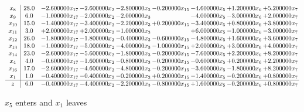 \documentclass[10pt]{article}
\begin{document}
 \[\begin{array}{c| c c@{\hskip 2pt} c@{\hskip 2pt} c@{\hskip 2pt} c@{\hskip 2pt} c@{\hskip 2pt} c@{\hskip 2pt} c@{\hskip 2pt} }
 x_{8}   &  28.0 & -2.600000 x_{17} & -2.600000 x_{2} & -2.800000 x_{3} & -0.200000 x_{15} & -4.600000 x_{5} & + 1.200000 x_{6} & + 5.200000 x_{7}\\
 x_{9}   &  6.0 & -1.000000 x_{17} & -2.000000 x_{2} & -2.000000 x_{3} &   & -4.000000 x_{5} & -3.000000 x_{6} & + 2.000000 x_{7}\\
 x_{10}   &  15.0 & -1.400000 x_{17} & -3.400000 x_{2} & -2.200000 x_{3} & + 0.200000 x_{15} & -3.400000 x_{5} & + 0.800000 x_{6} & + 3.800000 x_{7}\\
 x_{11}   &  3.0 & + 2.000000 x_{17} & + 2.000000 x_{2} & -1.000000 x_{3} &   & + 6.000000 x_{5} & -1.000000 x_{6} & -3.000000 x_{7}\\
 x_{12}   &  26.0 & -1.800000 x_{17} & -1.800000 x_{2} & -0.400000 x_{3} & -0.600000 x_{15} & -4.800000 x_{5} & + 1.600000 x_{6} & + 3.600000 x_{7}\\
 x_{13}   &  18.0 & -1.000000 x_{17} & -5.000000 x_{2} & -4.000000 x_{3} & -1.000000 x_{15} & + 2.000000 x_{5} & + 3.000000 x_{6} & + 4.000000 x_{7}\\
 x_{14}   &  23.0 & -2.600000 x_{17} & -5.600000 x_{2} & -1.800000 x_{3} & -0.200000 x_{15} & -7.600000 x_{5} & + 2.200000 x_{6} & + 8.200000 x_{7}\\
 x_{4}   &  4.0 & -0.600000 x_{17} & -1.600000 x_{2} & -0.800000 x_{3} & -0.200000 x_{15} & -0.600000 x_{5} & + 0.200000 x_{6} & + 2.200000 x_{7}\\
 x_{16}   &  17.0 & -2.600000 x_{17} & -4.600000 x_{2} & -4.800000 x_{3} & -0.200000 x_{15} & -3.600000 x_{5} & -1.800000 x_{6} & + 8.200000 x_{7}\\
 x_{1}   &  1.0 & -0.400000 x_{17} & -0.400000 x_{2} & -0.200000 x_{3} & + 0.200000 x_{15} & -1.400000 x_{5} & -0.200000 x_{6} & + 0.800000 x_{7}\\
\hline
z    &  6.0 & -0.400000 x_{17} & -4.400000 x_{2} & -2.200000 x_{3} & -0.800000 x_{15} & + 1.600000 x_{5} & -0.200000 x_{6} & + 0.800000 x_{7}\\
\end{array}\]


 $ x_{5} $ enters and $ x_{1} $ leaves 
\end{document}
